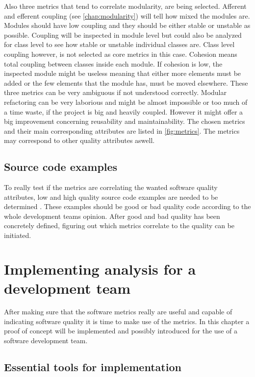 Also three metrics that tend to correlate modularity, are being selected. Afferent and efferent coupling (see \autoref{chap:modularity}) will tell how mixed the modules are. Modules should have low coupling and they should be either stable or unstable as possible. Coupling will be inspected in module level but could also be analyzed for class level to see how stable or unstable individual classes are. Class level coupling however, is not selected as core metrics in this case. Cohesion means total coupling between classes inside each module. If cohesion is low, the inspected module might be useless meaning that either more elements must be added or the few elements that the module has, must be moved elsewhere. These three metrics can be very ambiguous if not understood correctly. Modular refactoring can be very laborious and might be almost impossible or too much of a time waste, if the project is big and heavily coupled. However it might offer a big improvement concerning reusability and maintainability. The chosen metrics and their main corresponding attributes are listed in \autoref{fig:metrics}. The metrics may correspond to other quality attributes aswell. 

\section{Source code examples}
To really test if the metrics are correlating the wanted software quality attributes, low and high quality source code examples are needed to be determined \cite{coleman1994using}. These examples should be good or bad quality code according to the whole development teams opinion. After good and bad quality has been concretely defined, figuring out which metrics correlate to the quality can be initiated. 




\chapter{Implementing analysis for a development team}

After making sure that the software metrics really are useful and capable of indicating software quality it is time to make use of the metrics. In this chapter a proof of concept will be implemented and possibly introduced for the use of a software development team.

\section{Essential tools for implementation}

